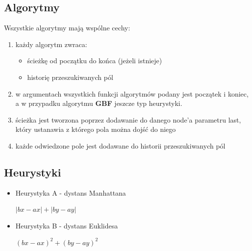 \documentclass{article}
\begin{document}
\subsection{Algorytmy}
Wszystkie algorytmy mają wspólne cechy:
\begin{enumerate}
	\item każdy algorytm zwraca:
	\begin{itemize}
		\item ścieżkę od początku do końca (jeżeli istnieje)
		\item historię przeszukiwanych pól
	\end{itemize}
	\item w argumentach wszystkich funkcji algorytmów podany jest początek i koniec, a w przypadku algorytmu \textbf{GBF} jeszcze typ heurystyki.
	\item ścieżka jest tworzona poprzez dodawanie do danego node'a parametru last, który ustanawia z którego pola można dojść do niego
	\item każde odwiedzone pole jest dodawane do historii przeszukiwanych pól
\end{enumerate}

\subsection{Heurystyki}
\begin{itemize}
\item Heurystyka A - dystans Manhattana\\
\begin{center}
$|bx-ax|+|by-ay|$
\end{center}
\item Heurystyka B - dystans Euklidesa\\
\begin{center}
$(bx-ax)^2+(by-ay)^2$
\end{center}
\end{itemize}
\end{document}
